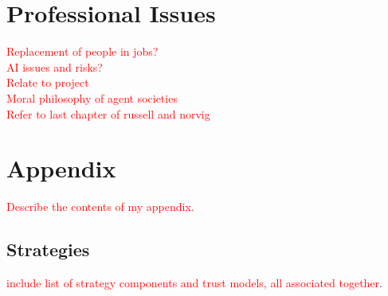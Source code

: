 \documentclass[]{final_report}
\begin{document}
\newpage
{}

\label{endpage}

\chapter{Professional Issues}
\textcolor{red}{Replacement of people in jobs?\\
AI issues and risks?\\
Relate to project\\
Moral philosophy of agent societies\\
Refer to last chapter of russell and norvig}

\chapter{Appendix}
\label{appendix}
\textcolor{red}{Describe the contents of my appendix.}
\section{Strategies}
\label{appendix:strats}
\textcolor{red}{include list of strategy components and trust models, all associated together}.

%

%

%

%	
	
\end{document}

